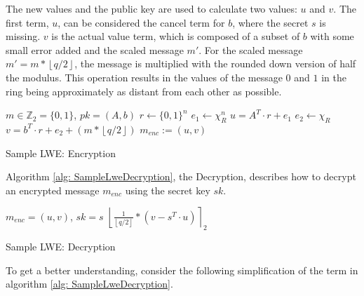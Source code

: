 The new values and the public key are used to calculate two values: $u$ and $v$. The first term, $u$, can be considered the cancel term for $b$, where the secret $s$ is missing. $v$ is the actual value term, which is composed of a subset of $b$ with some small error added and the scaled message $m'$. For the scaled message $m' = m*\left\lfloor q/2\right\rfloor$, the message is multiplied with the rounded down version of half the modulus. This operation results in the values of the message $0$ and $1$ in the ring being approximately as distant from each other as possible.

\begin{algorithm}[htb]
  \begin{algorithmic}[1]
    \REQUIRE $m \in \mathbb{Z}_2 = \{0, 1\}$, $pk = (A, b)$
    \STATE $r \leftarrow \{0, 1\}^n$
    \STATE $e_1 \leftarrow \chi_R^n$
    \STATE $u = A^T \cdot r + e_1$
    \STATE $e_2 \leftarrow \chi_R$
    \STATE $v = b^T \cdot r + e_2 + (m*\left\lfloor q/2\right\rfloor)$
    \RETURN $m_{enc} := (u, v)$
  \end{algorithmic}
  \caption{Sample LWE: Encryption}
  \label{alg: SampleLweEncryption}
\end{algorithm}

Algorithm \ref{alg: SampleLweDecryption}, the Decryption, describes how to decrypt an encrypted message $m_{enc}$ using the secret key $sk$.



\begin{algorithm}[htb]
  \begin{algorithmic}[1]
    \REQUIRE $m_{enc} = (u, v)$, $sk = s$
    \RETURN $\left\lfloor \frac{1}{\left\lfloor q/2\right\rfloor}*(v-s^T \cdot u)\right\rceil _2$
  \end{algorithmic}
  \caption{Sample LWE: Decryption}
  \label{alg: SampleLweDecryption}
\end{algorithm}


To get a better understanding, consider the following simplification of the term in algorithm \ref{alg: SampleLweDecryption}.

